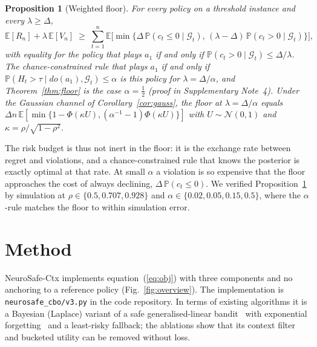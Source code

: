 \documentclass[10pt,a4paper]{article}
\newtheorem{proposition}{Proposition}
\begin{document}
\begin{proposition}[Weighted floor]\label{prop:alpha}
For every policy on a threshold instance and every $\lambda\ge\Delta$,
\begin{equation}
\mathbb E[R_n]+\lambda\,\mathbb E[V_n]\;\ge\;\sum_{t=1}^n\mathbb E\big[\min\{\Delta\,\mathbb P(c_t\le0\mid\mathcal G_t),\,(\lambda-\Delta)\,\mathbb P(c_t>0\mid\mathcal G_t)\}\big],
\label{eq:wfloor}
\end{equation}
with equality for the policy that plays $a_1$ if and only if $\mathbb P(c_t>0\mid\mathcal G_t)\le\Delta/\lambda$. The chance-constrained rule that plays $a_1$ if and only if $\mathbb P(H_t>\tau\mid do(a_1),\mathcal G_t)\le\alpha$ is this policy for $\lambda=\Delta/\alpha$, and Theorem~\ref{thm:floor} is the case $\alpha=\tfrac12$ (proof in Supplementary Note~4). Under the Gaussian channel of Corollary~\ref{cor:gauss}, the floor at $\lambda=\Delta/\alpha$ equals $\Delta n\,\mathbb E[\min\{1-\Phi(\kappa U),(\alpha^{-1}-1)\Phi(\kappa U)\}]$ with $U\sim\mathcal N(0,1)$ and $\kappa=\rho/\sqrt{1-\rho^2}$.
\end{proposition}



The risk budget is thus not inert in the floor: it is the exchange rate between regret and violations, and a chance-constrained rule that knows the posterior is exactly optimal at that rate. At small $\alpha$ a violation is so expensive that the floor approaches the cost of always declining, $\Delta\,\mathbb P(c_t\le0)$. We verified Proposition~\ref{prop:alpha} by simulation at $\rho\in\{0.5,0.707,0.928\}$ and $\alpha\in\{0.02,0.05,0.15,0.5\}$, where the $\alpha$-rule matches the floor to within simulation error.

\section*{Method}

NeuroSafe-Ctx implements equation~(\ref{eq:obj}) with three components and no anchoring to a
reference policy (Fig.~\ref{fig:overview}). The implementation is \texttt{neurosafe\_cbo/v3.py} in the code repository. In terms of existing algorithms it is a Bayesian (Laplace) variant of a safe generalised-linear bandit~\cite{amani2020glm} with exponential forgetting~\cite{russac2021} and a least-risky fallback; the ablations show that its context filter and bucketed utility can be removed without loss.
\end{document}
